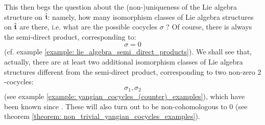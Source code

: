         This then begs the question about the (non-)uniqueness of the Lie algebra structure on $\hat{\mathfrak{t}}$: namely, how many isomorphism classes of Lie algebra structures on $\hat{\mathfrak{t}}$ are there, i.e. what are the possible cocycles $\sigma$ ? Of course, there is always the semi-direct product, corresponding to:
            $$\sigma = 0$$
        (cf. example \ref{example: lie_algebra_semi_direct_products}). We shall see that, actually, there are at least two additional isomorphism classes of Lie algebra structures different from the semi-direct product, corresponding to two non-zero $2$-cocycles:
            $$\sigma_1, \sigma_2$$
        (see example \ref{example: yangian_cocycles_(counter)_examples}), which have been known since \cite{billig_energy_momentum_tensor}. These will also turn out to be non-cohomologous to $0$ (see theorem \ref{theorem: non_trivial_yangian_cocycles_examples}).
        
